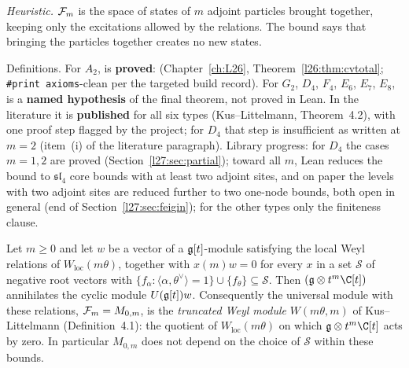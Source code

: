 \begin{physics}
\emph{Heuristic.} $\mathcal F_m$ is the space of states of $m$ adjoint particles brought together, keeping only the
excitations allowed by the relations. The bound says that bringing the particles together creates no new states.
\end{physics}

\begin{status}
Definitions. For $A_2$,  is \textbf{proved}:  (Chapter~\ref{ch:L26},
Theorem~\ref{l26:thm:cvtotal}; \texttt{\#print axioms}-clean per the targeted build record). For $G_2$, $D_4$, $F_4$, $E_6$, $E_7$,
$E_8$,  is a \textbf{named hypothesis} of the final theorem, not proved in Lean. In the literature it is
\textbf{published} for all six types (Kus--Littelmann, Theorem~4.2), with one proof step flagged by the project; for $D_4$
that step is insufficient as written at $m=2$ (item~(i) of the literature paragraph). Library progress:
for $D_4$ the cases $m=1,2$ are proved (Section~\ref{l27:sec:partial}); toward all $m$, Lean reduces the bound to
$\mathfrak{sl}_4$ core bounds with at least two adjoint sites, and on paper the levels with two adjoint sites are reduced further
to two one-node bounds, both open in general (end of Section~\ref{l27:sec:feigin}); for the other types only the finiteness clause.
\end{status}

\begin{lemma}\label{l27:lem:truncweyl}
Let $m\ge0$ and let $w$ be a vector of a $\mathfrak g[t]$-module satisfying the local Weyl relations of
$W_{\mathrm{loc}}(m\theta)$, together with $x(m)w=0$ for every $x$ in a set $\mathcal S$ of negative root vectors with
$\{f_\alpha:\langle\alpha,\theta^\vee\rangle=1\}\cup\{f_\theta\}\subseteq\mathcal S$. Then $(\ltwentyseveng\otimes t^m\C[t])$
annihilates the cyclic module $U(\mathfrak g[t])w$. Consequently the universal module with these relations,
$\mathcal F_m=M_{0,m}$, is the \emph{truncated Weyl module} $W(m\theta,m)$ of Kus--Littelmann (Definition~4.1): the
quotient of $W_{\mathrm{loc}}(m\theta)$ on which $\ltwentyseveng\otimes t^m\C[t]$ acts by zero. In particular $M_{0,m}$ does not
depend on the choice of $\mathcal S$ within these bounds.
\end{lemma}

